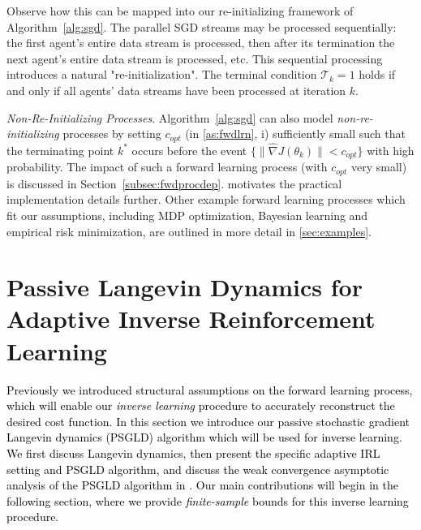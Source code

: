 \documentclass[journal,onecolumn]{IEEEtran}
\newcommand{\thk}{\theta_k}
\newcommand{\gradn}{\hat{\nabla}}
\newcommand{\rew}{J}
\newcommand{\sgdtm}{c_{opt}}
\newcommand{\ks}{k^*}
\begin{document}
{    Observe how this can be mapped into our re-initializing framework of Algorithm~\ref{alg:sgd}. The parallel SGD streams may be processed sequentially: the first agent's entire data stream is processed, then after its termination the next agent's entire data stream is processed, etc. This sequential processing introduces a natural "re-initialization". The terminal condition $\mathcal{T}_k = 1$ holds if and only if all agents' data streams have been processed at iteration $k$.

\textit{Non-Re-Initializing Processes}. Algorithm~\ref{alg:sgd} can also model \textit{non-re-initializing} processes by setting $\sgdtm$ (in \ref{as:fwdlrn}, i) sufficiently small such that the terminating point $\ks$ occurs before the event $\{\|\gradn\rew(\thk)\| < \sgdtm\}$ with high probability. The impact of such a forward learning process (with $\sgdtm$ very small) is discussed in Section~\ref{subsec:fwdprocdep}. \cite{krishnamurthy2021langevin} motivates the practical implementation details further. Other example forward learning processes which fit our assumptions, including MDP optimization, Bayesian learning and empirical risk minimization, are outlined in more detail in \ref{sec:examples}. 

}


\section{Passive Langevin Dynamics for Adaptive Inverse Reinforcement Learning}
\label{sec:background}
\textcolor{black}{Previously we introduced structural assumptions on the forward learning process, which will enable our \textit{inverse learning} procedure to accurately reconstruct the desired cost function. In this section we introduce our passive stochastic gradient Langevin dynamics (PSGLD) algorithm which will be used for inverse learning. We first discuss Langevin dynamics, then present the specific adaptive IRL setting and PSGLD algorithm, and discuss the weak convergence asymptotic analysis of the PSGLD algorithm in \cite{krishnamurthy2021langevin}. Our main contributions will begin in the following section, where we provide \textit{finite-sample} bounds for this inverse learning procedure.}
 
\end{document}
